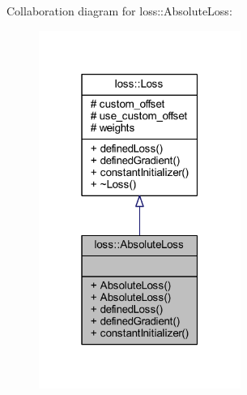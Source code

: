 Collaboration diagram for loss\+:\+:Absolute\+Loss\+:\nopagebreak
\begin{figure}[H]
\begin{center}
\leavevmode
\includegraphics[width=187pt]{classloss_1_1_absolute_loss__coll__graph}
\end{center}
\end{figure}
